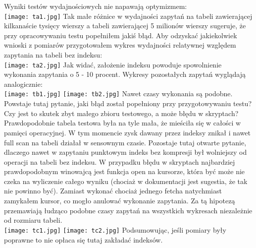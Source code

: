 \documentclass[a4paper,11pt]{article}
\begin{document}
Wyniki testów wydajnościowych nie napawają optymizmem:\\
\texttt{[image: ta1.jpg]}
Tak małe różnice w wydajności zapytań na tabeli zawierającej kilkanaście tysięcy wierszy a tabeli zawierającej 5 milionów wierszy sugeruje, że przy opracowywaniu testu popełniłem jakiś błąd. Aby odzyskać jakiekolwiek wnioski z pomiarów przygotowałem wykres wydajności relatywnej względem zapytania na tabeli bez indeksu:\\
\texttt{[image: ta2.jpg]}
Jak widać, założenie indeksu powoduje spowolnienie wykonania zapytania o 5 - 10 procent. Wykresy pozostałych zapytań wyglądają analogicznie:\\
\texttt{[image: tb1.jpg]}
\texttt{[image: tb2.jpg]}
Nawet czasy wykonania są podobne. Powstaje tutaj pytanie, jaki błąd został popełniony przy przygotowywaniu testu?
Czy jest to skutek zbyt małego zbioru testowego, a może błędu w skryptach? Prawdopodobnie tabela testowa była na
tyle mała, że mieściła się w całości w pamięci operacyjnej. W tym momencie zysk dawany przez indeksy znikał i nawet
full scan na tabeli działał w sensownym czasie. Pozostaje tutaj otwarte pytanie, dlaczego nawet w zapytaniu punktowym indeks bez kompresji był wolniejszy od operacji na tabeli bez indeksu. W przypadku błędu w skryptach najbardziej 
prawdopodobnym winowajcą jest funkcja open na kursorze, która być może nie czeka na wyliczenie całego wyniku (chociaż w dokumentacji jest sugestia, że tak nie powinno być). Zamiast wykonać chociaż jednego fetcha natychmiast zamykałem kursor, co mogło anulować wykonanie zapytania. Za tą hipotezą przemawiają łudząco podobne czasy zapytań na wszystkich wykresach niezależnie od rozmiaru tabeli.\\
\texttt{[image: tc1.jpg]}
\texttt{[image: tc2.jpg]}
Podsumowując, jeśli pomiary były poprawne to nie opłaca się tutaj zakładać indeksów.
\end{document}
